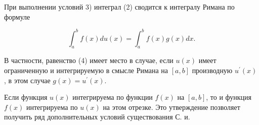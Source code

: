 \documentclass[10pt]{article}
\begin{document}
При выполнении условий 3) интеграл (2) сводится к интегралу Римана по формуле



\[

\int_{a}^{b} f(x) d u(x)=\int_{a}^{b} f(x) g(x) d x .

\]



В частности, равенство (4) имеет место в случае, если $u(x)$ имеет ограниченную и интегрируемую в смысле Римана на $[a, b]$ производную $u^{\prime}(x)$, в этом случае $g(x)=u^{\prime}(x)$.



Если функция $u(x)$ интегрируема по функции $f(x)$ на $[a, b]$, то и функция $f(x)$ интегрируема по $u(x)$ на этом отрезке. Это утверждение позволяет получить ряд дополнительных условий существования С. и.
\end{document}
